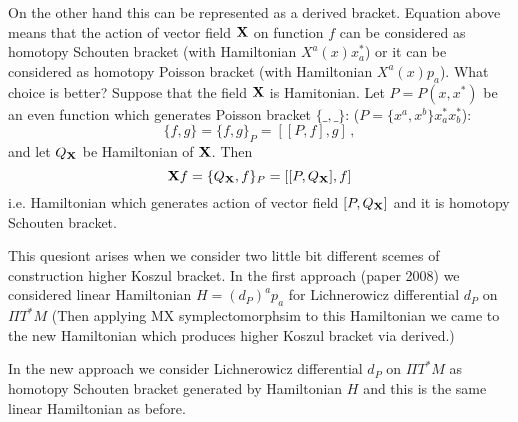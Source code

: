 On the other hand this can be represented as
a derived bracket.
Equation above means that 
the action of vector field ${\bf X}$ on function
$f$ can be considered as homotopy
Schouten bracket (with Hamiltonian $X^a(x)x_a^*$)
or it can be considered as homotopy
Poisson bracket (with Hamiltonian $X^a(x)p_a$).
  What choice is better?
   Suppose that the  field ${\bf X}$ 
is Hamitonian.
Let $P=P(x,x^*)$  be an
even function which  generates  Poisson bracket $\{\_,\_\}$:
              ($P=\{x^a,x^b\}x_a^*x_b^*$):
         $$
\{f,g\}=\{f,g\}_P=[[P,f],g]\,,
          $$
and let $Q_{\bf X}$ 
be Hamiltonian of ${\bf X}$. Then
          $$
{\bf X} f=\{Q_{\bf X},f\}_P=[[P,Q_{\bf X}],f]
          $$
i.e. Hamiltonian which generates action of vector field
$[P,Q_{\bf X}]$ and it is homotopy Schouten bracket.


 This quesiont arises when we consider two little bit different
scemes of construction higher Koszul bracket.
In the first approach (paper 2008)
we considered linear Hamiltonian  $H=\left(d_P\right)^a p_a$
for Lichnerowicz differential $d_P$ on $\Pi T^*M$
(Then applying MX symplectomorphsim to this Hamiltonian
 we came to the new Hamiltonian which produces
higher Koszul bracket via derived.)

In the new approach we consider Lichnerowicz differential 
$d_P$ on $\Pi T^*M$ as homotopy Schouten bracket
generated by Hamiltonian $H$ and this is the same linear
Hamiltonian as before.

\bye
